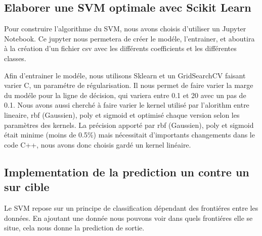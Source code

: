 \documentclass[10pt]{article}
\begin{document}
\subsection{Elaborer une SVM optimale avec Scikit Learn}

Pour construire l'algorithme du SVM, nous avons choisis d'utiliser un Jupyter Notebook. Ce jupyter nous permetera de créer le modéle, l'entrainer, et aboutira à la création d'un fichier csv avec les différents coefficients et les différentes classes.

Afin d'entrainer le modéle, nous utilisons Sklearn et un GridSearchCV faisant varier C, un paramétre de régularisation. Il nous permet de faire varier la marge du modéle pour la ligne de décision, qui variera entre 0.1 et 20 avec un pas de 0.1. Nous avons aussi cherché à faire varier le kernel utilisé par l'alorithm entre lineaire, rbf (Gaussien), poly et sigmoid et optimisé chaque version selon les paramètres des kernels. La précision apporté par  rbf (Gaussien), poly et sigmoid était minime (moins de 0.5\%) mais nécessitait d'importants changements dans le code C++, nous avons donc choisis gardé un kernel linéaire.

\subsection{Implementation de la prediction un contre un sur cible}

Le SVM repose sur un principe de classification dépendant des frontiéres entre les données. En ajoutant une donnée nous pouvons voir dans quels frontiéres elle se situe, cela nous donne la prediction de sortie.
\end{document}
